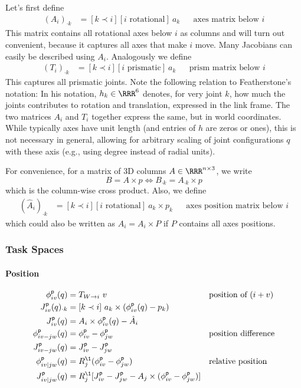 \documentclass[10pt,fleqn,twoside]{article}
\newcommand{\pos}{{\textsf{p}}}
\newcommand{\TR}[2]{T_{{#1}\rightarrow{#2}}}
\begin{document}
{{Let's first define
\begin{align}
(A_i)_{\cdot k}
&= [k \prec i] [\text{$i$ rotational}]~ a_k && \text{axes matrix below $i$}
\end{align}
This matrix contains all rotational axes below $i$ as columns and will
turn out convenient, because it captures all axes that make $i$
move. Many Jacobians can easily be described using $A_i$. Analogously
we define
\begin{align}
(T_i)_{\cdot k}
&= [k \prec i] [\text{$i$ prismatic}]~ a_k && \text{prism matrix below $i$}
\end{align}
This captures all prismatic joints. Note the following relation to
Featherstone's notation: In his notation, $h_k\in\RRR^6$ denotes, for
very joint $k$, how much the joints contributes to rotation and translation,
expressed in the link frame. The two matrices $A_i$ and $T_i$ together
express the same, but in world coordinates. While typically axes have
unit length (and entries of $h$ are zeros or ones), this is not necessary
in general, allowing for arbitrary scaling of joint configurations $q$
with these axis (e.g., using degree instead of radial units).

For convenience, for a matrix of 3D columns $A\in\RRR^{n\times 3}$, we write
$$B = A\times p \iff B_{\cdot k} = A_{\cdot k} \times p$$
which is the column-wise cross product. Also, we define
\begin{align}
(\hat A_i)_{\cdot k}
&= [k \prec i] [\text{$i$ rotational}]~ a_k \times p_k && \text{axes
    position matrix below $i$}
\end{align}
which could also be written as $\hat A_i = A_i \times P$ if $P$
contains all axes positions.


\subsubsection{Task Spaces}

\paragraph{Position}

\begin{align}
\phi^\pos_{iv}(q)
 &= \TR{W}{i}~ v
 && \text{position of $(i+v)$} \\
J^\pos_{iv}(q)_{\cdot k}
 &= [k\prec i]~ a_k \times(\phi^\pos_{iv}(q) - p_k) \\
J^\pos_{iv}(q)
 &= A_i \times \phi^\pos_{iv}(q) - \hat A_i \\
\phi^\pos_{iv-jw}(q)
 &= \phi^\pos_{iv} - \phi^\pos_{jw}
 && \text{position difference} \\
J^\pos_{iv-jw}(q)
 & = J^\pos_{iv} - J^\pos_{jw} \\
\phi^\pos_{iv|jw}(q)
 & = R_j^\1 (\phi^\pos_{iv} - \phi^\pos_{jw})
 && \text{relative position} \\
J^\pos_{iv|jw}(q)
 & = R_j^\1 [J^\pos_{iv}-J^\pos_{jw} - A_j \times (\phi^\pos_{iv} - \phi^\pos_{jw})]
\end{align}

}}
\end{document}
